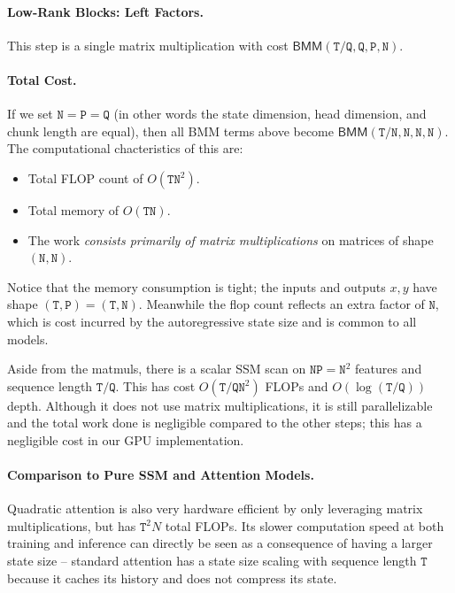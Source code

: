 \paragraph{Low-Rank Blocks: Left Factors.} This step is a single matrix multiplication with cost $\mathsf{BMM}(\mathtt{T}/\mathtt{Q}, \mathtt{Q}, \mathtt{P}, \mathtt{N})$.

\paragraph{Total Cost.} If we set $\mathtt{N} = \mathtt{P} = \mathtt{Q}$ (in other words the state dimension, head dimension, and chunk length are equal), then all BMM terms above become $\mathsf{BMM}(\mathtt{T}/\mathtt{N}, \mathtt{N}, \mathtt{N}, \mathtt{N})$.
The computational chacteristics of this are:

\begin{itemize}
  \item Total FLOP count of $O(\mathtt{TN}^2)$.
  \item Total memory of $O(\mathtt{TN})$.
  \item The work \emph{consists primarily of matrix multiplications} on matrices of shape $(\mathtt{N}, \mathtt{N})$.
\end{itemize}

Notice that the memory consumption is tight; the inputs and outputs $x, y$ have shape $(\mathtt{T}, \mathtt{P}) = (\mathtt{T}, \mathtt{N})$.
Meanwhile the flop count reflects an extra factor of $\mathtt{N}$, which is cost incurred by the autoregressive state size and is common to all models.

Aside from the matmuls, there is a scalar SSM scan on $\mathtt{NP} = \mathtt{N}^2$ features and sequence length $\mathtt{T}/\mathtt{Q}$.
This has cost $O(\mathtt{T}/\mathtt{Q} \mathtt{N}^2)$ FLOPs and $O(\log(\mathtt{T}/\mathtt{Q}))$ depth. Although it does not use matrix multiplications, it is still parallelizable and the total work done is negligible compared to the other steps; this has a negligible cost in our GPU implementation.

\paragraph{Comparison to Pure SSM and Attention Models.}

Quadratic attention is also very hardware efficient by only leveraging matrix multiplications, but has $\mathtt{T}^2 N$ total FLOPs. Its slower computation speed at both training and inference can directly be seen as a consequence of having a larger state size -- standard attention has a state size scaling with sequence length $\mathtt{T}$ because it caches its history and does not compress its state.

